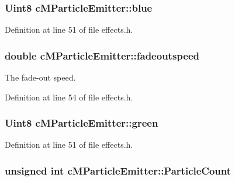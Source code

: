 \hypertarget{classc_m_particle_emitter_a7ee88308d39c49ce7cbcce4e7db47cdd}{
\subsubsection[{blue}]{\setlength{\rightskip}{0pt plus 5cm}Uint8 c\-M\-Particle\-Emitter\-::blue}}\label{classc_m_particle_emitter_a7ee88308d39c49ce7cbcce4e7db47cdd}


Definition at line 51 of file effects.\-h.

\hypertarget{classc_m_particle_emitter_ada8241a679db62be8ed1f8ec4637d484}{
\subsubsection[{fadeoutspeed}]{\setlength{\rightskip}{0pt plus 5cm}double c\-M\-Particle\-Emitter\-::fadeoutspeed}}\label{classc_m_particle_emitter_ada8241a679db62be8ed1f8ec4637d484}


The fade-\/out speed. 



Definition at line 54 of file effects.\-h.

\hypertarget{classc_m_particle_emitter_a08e621b7f89ba82db3c60d938d07df51}{
\subsubsection[{green}]{\setlength{\rightskip}{0pt plus 5cm}Uint8 c\-M\-Particle\-Emitter\-::green}}\label{classc_m_particle_emitter_a08e621b7f89ba82db3c60d938d07df51}


Definition at line 51 of file effects.\-h.

\hypertarget{classc_m_particle_emitter_adf8d9bb4c82e713c5b3f90765340da5e}{
\subsubsection[{Particle\-Count}]{\setlength{\rightskip}{0pt plus 5cm}unsigned int c\-M\-Particle\-Emitter\-::\-Particle\-Count}}\label{classc_m_particle_emitter_adf8d9bb4c82e713c5b3f90765340da5e}


